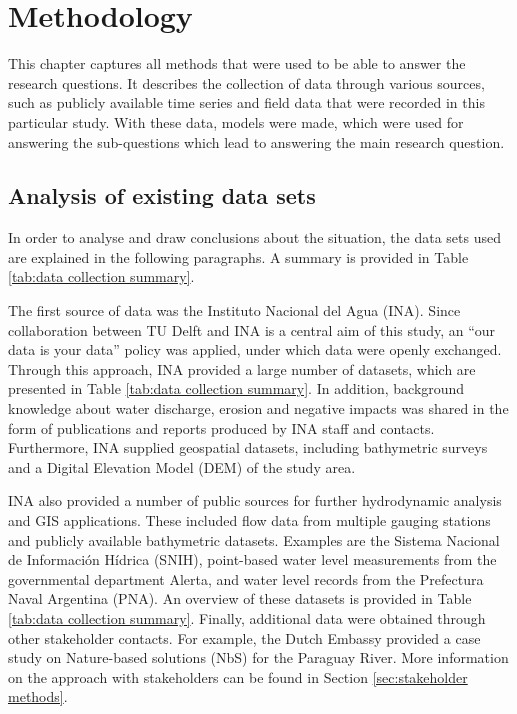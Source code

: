 \chapter{Methodology}
\label{chap:methodology}

This chapter captures all methods that were used to be able to answer the research questions. It describes the collection of data through various sources, such as publicly available time series and field data that were recorded in this particular study. With these data, models were made, which were used for answering the sub-questions which lead to answering the main research question. 

\section{Analysis of existing data sets}
\label{sec:desk study}
In order to analyse and draw conclusions about the situation, the data sets used are explained in the following paragraphs. A summary is provided in Table \ref{tab:data collection summary}.

The first source of data was the Instituto Nacional del Agua (INA). Since collaboration between TU Delft and INA is a central aim of this study, an “our data is your data” policy was applied, under which data were openly exchanged. Through this approach, INA provided a large number of datasets, which are presented in Table \ref{tab:data collection summary}. In addition, background knowledge about water discharge, erosion and negative impacts was shared in the form of publications and reports produced by INA staff and contacts. Furthermore, INA supplied geospatial datasets, including bathymetric surveys and a Digital Elevation Model (DEM) of the study area.

INA also provided a number of public sources for further hydrodynamic analysis and GIS applications. These included flow data from multiple gauging stations and publicly available bathymetric datasets. Examples are the Sistema Nacional de Información Hídrica (SNIH), point-based water level measurements from the governmental department Alerta, and water level records from the Prefectura Naval Argentina (PNA). An overview of these datasets is provided in Table \ref{tab:data collection summary}.
Finally, additional data were obtained through other stakeholder contacts. For example, the Dutch Embassy provided a case study on Nature-based solutions (NbS) for the Paraguay River. More information on the approach with stakeholders can be found in Section \ref{sec:stakeholder methods}.

